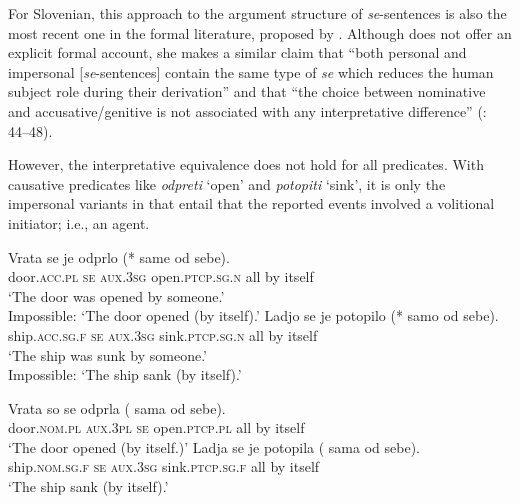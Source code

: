 \documentclass[output=paper,
modfonts,nonflat,
newtxmath
]{langsci/langscibook}
\begin{document}
For Slovenian, this approach to the argument structure of \textit{se}-sentences is also the most recent one in the formal literature, proposed by \citet{grahek2008}. Although \citeauthor{grahek2008} does not offer an explicit formal account, she makes a similar claim that “both personal and impersonal [\textit{se}-sentences] contain the same type of \textit{se} which reduces the human subject role during their derivation'' and that “the choice between nominative and accusative/genitive is not associated with any interpretative difference'' (\citealt{grahek2008}: 44--48). \par

However, the interpretative equivalence does not hold for all predicates. With causative predicates like \textit{odpreti} `open' and \textit{potopiti} `sink', it is only the impersonal variants in  that entail that the reported events involved a volitional initiator; i.e., an agent.

\begin{exe}
\ex \label{ex:lenardic: 4}
\begin{xlist}
\ex \gll Vrata se je odprlo (*\hspace{-2pt} same od sebe).\\
door.\textsc{acc.pl} \textsc{se} \textsc{aux}.\textsc{3sg} open.\textsc{ptcp.sg.n} {} all by itself\\
\trans `The door was opened by someone.'\\ Impossible: `The door opened (by itself).'
\ex \label{ex:lenardic: 4b} \gll Ladjo se je potopilo (*\hspace{-2pt} samo od sebe).\\
ship.\textsc{acc.sg.f} \textsc{se} \textsc{aux}.\textsc{3sg} sink.\textsc{ptcp.sg.n} {} all by itself\\
\trans `The ship was sunk by someone.'\\ Impossible: `The ship sank (by itself).'
\end{xlist}
\ex \label{ex:lenardic: 5} \begin{xlist}
\ex \gll Vrata so se odprla (\hspace{-2pt} sama od sebe).\\
door.\textsc{nom.pl} \textsc{aux}.\textsc{3pl} \textsc{se} open.\textsc{ptcp.pl} {} all by itself\\
\trans `The door opened (by itself.)'
\ex \gll Ladja se je potopila (\hspace{-2pt} sama od sebe).\\
ship.\textsc{nom.sg.f} \textsc{se} \textsc{aux}.\textsc{3sg} sink.\textsc{ptcp.sg.f} {} all by itself\\
\trans `The ship sank (by itself).'
\end{xlist}
\end{exe} \par
\end{document}
